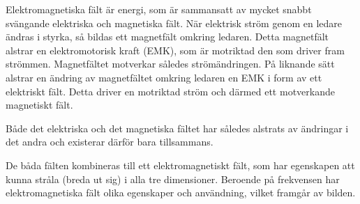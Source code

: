 \documentclass[a4paper,twoside,twocolumn,openright]{book}
\begin{document}
Elektromagnetiska fält är energi, som är sammansatt av mycket snabbt svängande elektriska
och magnetiska fält. När elektrisk ström genom en ledare ändras i styrka, så bildas ett
magnetfält omkring ledaren. Detta magnetfält alstrar en elektromotorisk kraft (EMK), som
är motriktad den som driver fram strömmen. Magnetfältet motverkar således strömändringen.
På liknande sätt alstrar en ändring av magnetfältet omkring ledaren en EMK i form av ett
elektriskt fält. Detta driver en motriktad ström och därmed ett motverkande magnetiskt
fält.

Både det elektriska och det magnetiska fältet har således alstrats av ändringar i det
andra och existerar därför bara tillsammans.

De båda fälten kombineras till ett elektromagnetiskt fält, som har egenskapen att kunna
stråla (breda ut sig) i alla tre dimensioner. Beroende på frekvensen har
elektromagnetiska fält olika egenskaper och användning, vilket framgår av bilden.
\end{document}
